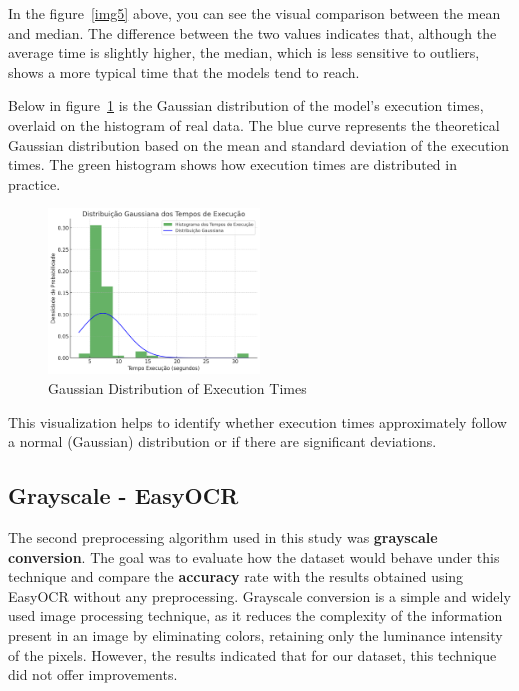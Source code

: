 \documentclass[conference]{IEEEtran}
\begin{document}
    In the figure~\ref{img5} above, you can see the visual comparison between the mean and median. The difference between the two values indicates that, although the average time is slightly higher, the median, which is less sensitive to outliers, shows a more typical time that the models tend to reach.
    
    Below in figure~\ref{img6} is the Gaussian distribution of the model's execution times, overlaid on the histogram of real data. The blue curve represents the theoretical Gaussian distribution based on the mean and standard deviation of the execution times. The green histogram shows how execution times are distributed in practice.
    
    \begin{figure}[htbp]
        \centerline{\includegraphics[width=0.5\textwidth]{img6.png}}
        \caption{Gaussian Distribution of Execution Times}
        \label{img6}
    \end{figure}
    
    This visualization helps to identify whether execution times approximately follow a normal (Gaussian) distribution or if there are significant deviations.
    
    \subsection{Grayscale - EasyOCR}
    
    The second preprocessing algorithm used in this study was \textbf{grayscale conversion}. The goal was to evaluate how the dataset would behave under this technique and compare the \textbf{accuracy} rate with the results obtained using EasyOCR without any preprocessing. Grayscale conversion is a simple and widely used image processing technique, as it reduces the complexity of the information present in an image by eliminating colors, retaining only the luminance intensity of the pixels. However, the results indicated that for our dataset, this technique did not offer improvements.
    
\end{document}
